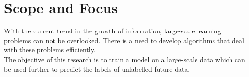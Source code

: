 \documentclass{article}
\begin{document}
\section{Scope and Focus}
With the current trend in the growth of information, large-scale learning problems can not be overlooked. There is a need to develop algorithms that deal with these problems efficiently.\\
The objective of this research is to train a model on a large-scale data which can be used further to predict the labels of unlabelled future data.
\end{document}

